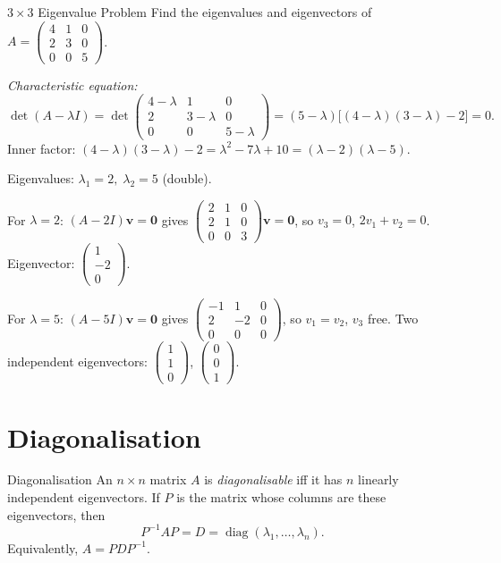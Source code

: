 \documentclass[12pt, a4paper]{book}
\newcommand{\inv}{^{-1}}
\renewcommand{\vec}[1]{\mathbf{#1}}
\begin{document}
\begin{example}{$3\times 3$ Eigenvalue Problem}{}
Find the eigenvalues and eigenvectors of
$A = \begin{pmatrix}4&1&0\\2&3&0\\0&0&5\end{pmatrix}$.

\textit{Characteristic equation:}
\[
\det(A-\lambda I)=\det\begin{pmatrix}4-\lambda&1&0\\2&3-\lambda&0\\0&0&5-\lambda\end{pmatrix}
=(5-\lambda)\bigl[(4-\lambda)(3-\lambda)-2\bigr]=0.
\]
Inner factor: $(4-\lambda)(3-\lambda)-2=\lambda^2-7\lambda+10=(\lambda-2)(\lambda-5)$.

Eigenvalues: $\lambda_1=2,\;\lambda_2=5$ (double).

For $\lambda=2$: $(A-2I)\vec{v}=\vec{0}$ gives $\begin{pmatrix}2&1&0\\2&1&0\\0&0&3\end{pmatrix}\vec{v}=\vec{0}$, so $v_3=0$, $2v_1+v_2=0$. Eigenvector: $\begin{pmatrix}1\\-2\\0\end{pmatrix}$.

For $\lambda=5$: $(A-5I)\vec{v}=\vec{0}$ gives $\begin{pmatrix}-1&1&0\\2&-2&0\\0&0&0\end{pmatrix}$, so $v_1=v_2$, $v_3$ free. Two independent eigenvectors: $\begin{pmatrix}1\\1\\0\end{pmatrix}$, $\begin{pmatrix}0\\0\\1\end{pmatrix}$.
\end{example}

\section{Diagonalisation}

\begin{theorem}{Diagonalisation}{}
An $n\times n$ matrix $A$ is \emph{diagonalisable} iff it has $n$ linearly independent eigenvectors. If $P$ is the matrix whose columns are these eigenvectors, then
\[
P\inv A P = D = \operatorname{diag}(\lambda_1,\ldots,\lambda_n).
\]
Equivalently, $A = PDP\inv$.
\end{theorem}
\end{document}
